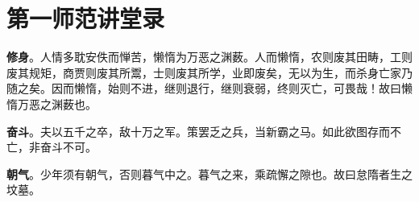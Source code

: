 
\section{第一师范讲堂录}

\textbf{修身}。人情多耽安佚而惮苦，懒惰为万恶之渊薮。人而懒惰，农则废其田畴，工则废其规矩，商贾则废其所鬻，士则废其所学，业即废矣，无以为生，而杀身亡家乃随之矣。因而懒惰，始则不进，继则退行，继则衰弱，终则灭亡，可畏哉！故曰懒惰万恶之渊薮也。

\textbf{奋斗}。夫以五千之卒，敌十万之军。策罢乏之兵，当新霸之马。如此欲图存而不亡，非奋斗不可。

\textbf{朝气}。少年须有朝气，否则暮气中之。暮气之来，乘疏懈之隙也。故曰怠隋者生之坟墓。